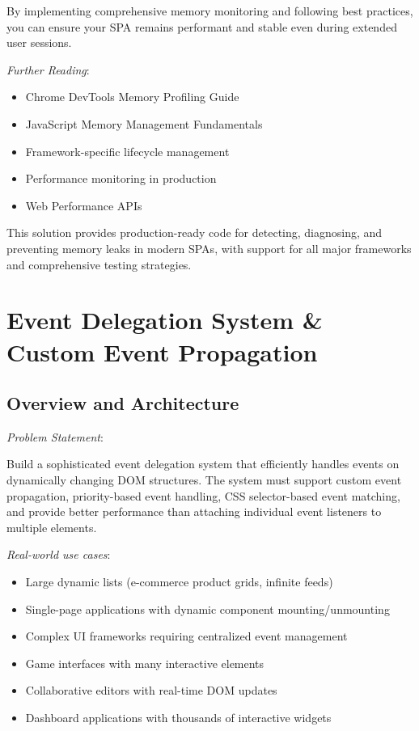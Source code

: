 \documentclass[11pt]{article}
\begin{document}
By implementing comprehensive memory monitoring and following best practices, you can ensure your SPA remains performant and stable even during extended user sessions.

\emph{Further Reading}:

\begin{itemize}
\item Chrome DevTools Memory Profiling Guide
\item JavaScript Memory Management Fundamentals
\item Framework-specific lifecycle management
\item Performance monitoring in production
\item Web Performance APIs
\end{itemize}

This solution provides production-ready code for detecting, diagnosing, and preventing memory leaks in modern SPAs, with support for all major frameworks and comprehensive testing strategies.
\section{Event Delegation System \& Custom Event Propagation}
\label{sec:org956590a}

\subsection{Overview and Architecture}
\label{sec:org8e1e5b8}

\emph{Problem Statement}:

Build a sophisticated event delegation system that efficiently handles events on dynamically changing DOM structures. The system must support custom event propagation, priority-based event handling, CSS selector-based event matching, and provide better performance than attaching individual event listeners to multiple elements.

\emph{Real-world use cases}:

\begin{itemize}
\item Large dynamic lists (e-commerce product grids, infinite feeds)
\item Single-page applications with dynamic component mounting/unmounting
\item Complex UI frameworks requiring centralized event management
\item Game interfaces with many interactive elements
\item Collaborative editors with real-time DOM updates
\item Dashboard applications with thousands of interactive widgets
\end{itemize}
\end{document}

